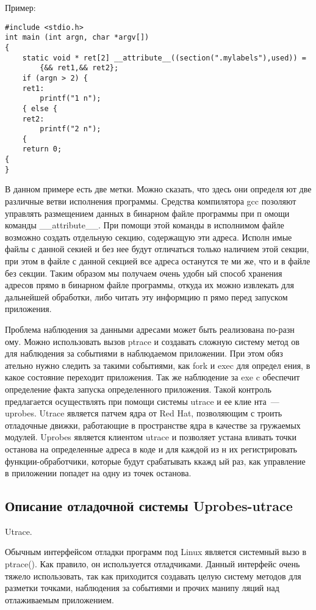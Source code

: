 Пример: 

\bigskip
\begin{lstlisting}
#include <stdio.h>
int main (int argn, char *argv[])
{ 
	static void * ret[2] __attribute__((section(".mylabels"),used)) = 
		{&& ret1,&& ret2};
	if (argn > 2) {
	ret1:
		printf("1 n");
	{ else {
	ret2:
		printf("2 n");
	{
	return 0;
{ 
}
\end{lstlisting}
\bigskip
В данном примере есть две метки. Можно сказать, что здесь они определя
ют две различные ветви исполнения программы. Средства компилятора gcc 
позоляют управлять размещением данных в бинарном файле программы при п
омощи команды \_\_attribute\_\_. При помощи этой команды в исполнимом 
файле возможно создать отдельную секцию, содержащую эти адреса. Исполн
имые файлы с данной секией и без нее будут отличаться только наличием 
этой секции, при этом в файле с данной секцией все адреса останутся те
ми же, что и в файле без секции. Таким образом мы получаем очень удобн
ый способ хранения адресов прямо в бинарном файле программы, откуда их
 можно извлекать для дальнейшей обработки, либо читать эту информцию п
рямо перед запуском приложения.

Проблема наблюдения за данными адресами может быть реализована по-разн
ому. Можно использовать вызов ptrace и создавать сложную систему метод
ов для наблюдения за событиями в наблюдаемом приложении. При этом обяз
ательно нужно следить за такими событиями, как fork и exec для определ
ения, в какое состояние переходит приложения. Так же наблюдение за exe
c обеспечит определение факта запуска определенного приложения. Такой 
контроль предлагается осуществлять при помощи системы utrace и ее клие
нта~--- uprobes. Utrace является патчем ядра от Red Hat, позволяющим с
троить отладочные движки, работающие в пространстве ядра в качестве за
гружаемых модулей. Uprobes является клиентом utrace и позволяет устана
вливать точки останова на определенные адреса в коде и для каждой из н
их регистрировать функции-обработчики, которые будут срабатывать ккажд
ый раз, как управление в приложении попадет на одну из точек останова.
 

\bigskip
\subsection{Описание отладочной системы Uprobes-utrace}

\bigskip
Utrace.

\bigskip
Обычным интерфейсом отладки программ под Linux является системный вызо
в ptrace(). Как правило, он используется отладчиками. Данный интерфейс
 очень тяжело использовать, так как приходится создавать целую систему
 методов для разметки точками, наблюдения за событиями и прочих манипу
ляций над отлаживаемым приложением. 

